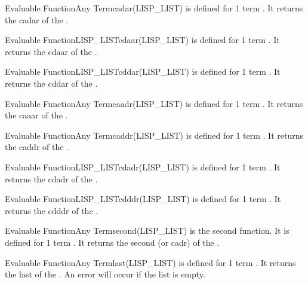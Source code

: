 \begin{typeefa}{Evaluable Function}{Any Term}{cadar}{(LISP\_LIST)}
is defined for 1 term . It returns the cadar  of the
.
\end{typeefa}

\begin{typeefa}{Evaluable Function}{LISP\_LIST}{cdaar}{(LISP\_LIST)}
is defined for 1 term . It returns the cdaar   of the
.
\end{typeefa}

\begin{typeefa}{Evaluable Function}{LISP\_LIST}{cddar}{(LISP\_LIST)}
is defined for 1 term . It returns the cddar  of the
.
\end{typeefa}

\begin{typeefa}{Evaluable Function}{Any Term}{caadr}{(LISP\_LIST)}
is defined for 1 term . It returns the caaar  of the
.
\end{typeefa}

\begin{typeefa}{Evaluable Function}{Any Term}{caddr}{(LISP\_LIST)}
is defined for 1 term . It returns the caddr  of the
.
\end{typeefa}

\begin{typeefa}{Evaluable Function}{LISP\_LIST}{cdadr}{(LISP\_LIST)}
is defined for 1 term . It returns the cdadr  of the
.
\end{typeefa}

\begin{typeefa}{Evaluable Function}{LISP\_LIST}{cdddr}{(LISP\_LIST)}
is defined for 1 term . It returns the cdddr
 of the .
\end{typeefa}

\begin{typeefa}{Evaluable Function}{Any Term}{second}{(LISP\_LIST)}
is the second function. It is defined for 1 term . It returns
the second (or cadr)  of the .
\end{typeefa}

\begin{typeefa}{Evaluable Function}{Any Term}{last}{(LISP\_LIST)}
 is defined for 1 term . It returns the last  of
 the . An error will occur if the list is empty.
\end{typeefa}

